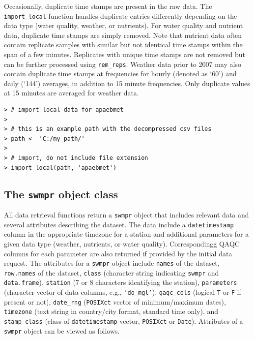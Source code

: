 \documentclass[10pt,letterpaper]{article}\usepackage[]{graphicx}\usepackage[]{color}
\makeatletter
\newenvironment{kframe}{%
 \def\at@end@of@kframe{}%
 \ifinner\ifhmode%
  \def\at@end@of@kframe{\end{minipage}}%
  \begin{minipage}{\columnwidth}%
 \fi\fi%
 \def\FrameCommand##1{\hskip\@totalleftmargin \hskip-\fboxsep
 \colorbox{shadecolor}{##1}\hskip-\fboxsep
     \hskip-\linewidth \hskip-\@totalleftmargin \hskip\columnwidth}%
 \MakeFramed {\advance\hsize-\width
   \@totalleftmargin\z@ \linewidth\hsize
   \@setminipage}}%
 {\par\unskip\endMakeFramed%
 \at@end@of@kframe}
\newenvironment{knitrout}{}{} %
\makeatother
\begin{document}
Occasionally, duplicate time stamps are present in the raw data.  The \texttt{import\_local} function handles duplicate entries differently depending on the data type (water quality,  weather, or nutrients).  For water quality and nutrient data, duplicate time stamps are simply removed.  Note that nutrient data often contain replicate samples with similar but not identical time stamps within the span of a few minutes.  Replicates with unique time stamps are not removed but can be further processed using \texttt{rem\_reps}.  Weather data prior to 2007 may also contain duplicate time stamps at frequencies for hourly (denoted as `60') and daily (`144') averages, in addition to 15 minute frequencies.  Only duplicate values at 15 minutes are averaged for weather data.  

\begin{knitrout}\small
{}\color{fgcolor}\begin{kframe}
\begin{verbatim}
> # import local data for apaebmet
> 
> # this is an example path with the decompressed csv files
> path <- 'C:/my_path/'
> 
> # import, do not include file extension
> import_local(path, 'apaebmet') 
\end{verbatim}
\end{kframe}
\end{knitrout}

\subsection*{The \texttt{swmpr} object class}

All data retrieval functions return a \texttt{swmpr} object that includes relevant data and several attributes describing the dataset.  The data include a \texttt{datetimestamp} column in the appropriate timezone for a station and additional parameters for a given data type (weather, nutrients, or water quality).  Correspondingg \ac{QAQC} columns for each parameter are also returned if provided by the initial data request.  The attributes for a \texttt{swmpr} object include \texttt{names} of the dataset, \texttt{row.names} of the dataset, \texttt{class} (character string indicating \texttt{swmpr} and \texttt{data.frame}), \texttt{station} (7 or 8 characters identifying the station),  \texttt{parameters} (character vector of data columns, e.g., \texttt{`do\_mgl'}), \texttt{qaqc\_cols} (logical \texttt{T} or \texttt{F} if present or not), \texttt{date\_rng} (\texttt{POSIXct} vector of minimum/maximum dates), \texttt{timezone} (text string in country/city format, standard time only), and \texttt{stamp\_class} (class of \texttt{datetimestamp} vector, \texttt{POSIXct} or \texttt{Date}).  Attributes of a \texttt{swmpr} object can be viewed as follows.
\end{document}

